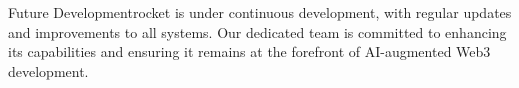 \begin{mfai-box-scale}{Future Development}{rocket}
 is under continuous development, with regular updates and improvements to all systems. Our dedicated team is committed to enhancing its capabilities and ensuring it remains at the forefront of AI-augmented Web3 development.
\end{mfai-box-scale}

\newpage 